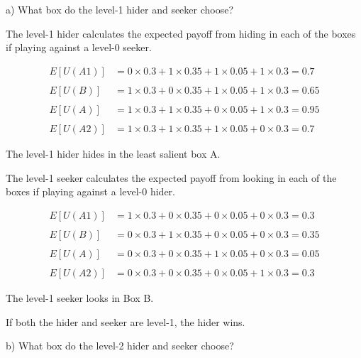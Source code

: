 \documentclass[
  letterpaper,
  DIV=11,
  numbers=noendperiod]{scrreprt}
\begin{document}
a) What box do the level-1 hider and seeker choose?

\begin{tcolorbox}[enhanced jigsaw, title=\textcolor{quarto-callout-tip-color}{\faLightbulb}\hspace{0.5em}{Answer}, toprule=.15mm, colback=white, breakable, titlerule=0mm, colframe=quarto-callout-tip-color-frame, coltitle=black, opacityback=0, rightrule=.15mm, colbacktitle=quarto-callout-tip-color!10!white, bottomtitle=1mm, opacitybacktitle=0.6, arc=.35mm, bottomrule=.15mm, toptitle=1mm, leftrule=.75mm, left=2mm]

The level-1 hider calculates the expected payoff from hiding in each of
the boxes if playing against a level-0 seeker.

\begin{align*}
E[U(A1)]&=0×0.3+1×0.35+1×0.05+1×0.3=0.7 \\
\\
E[U(B)]&=1×0.3+0×0.35+1×0.05+1×0.3=0.65 \\
\\
E[U(A)]&=1×0.3+1×0.35+0×0.05+1×0.3=0.95 \\
\\
E[U(A2)]&=1×0.3+1×0.35+1×0.05+0×0.3=0.7
\end{align*}

The level-1 hider hides in the least salient box A.

The level-1 seeker calculates the expected payoff from looking in each
of the boxes if playing against a level-0 hider.

\begin{align*}
E[U(A1)]&=1×0.3+0×0.35+0×0.05+0×0.3=0.3 \\
\\
E[U(B)]&=0×0.3+1×0.35+0×0.05+0×0.3=0.35 \\
\\
E[U(A)]&=0×0.3+0×0.35+1×0.05+0×0.3=0.05 \\
\\
E[U(A2)]&=0×0.3+0×0.35+0×0.05+1×0.3=0.3
\end{align*}

The level-1 seeker looks in Box B.

If both the hider and seeker are level-1, the hider wins.

\end{tcolorbox}

b) What box do the level-2 hider and seeker choose?
\end{document}
